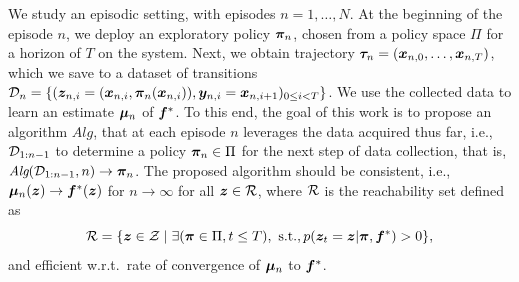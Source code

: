 We study an episodic setting, with episodes $n=1, \ldots, N$. At the beginning of the episode $n$, we deploy an exploratory policy ${\bm{\pi}}_n$, chosen from a policy space $\Pi$ for a horizon of $T$ on the system.  Next, we obtain trajectory ${\bm{\tau}}_n = ({\bm{x}}_{n,0}, \ldots, {\bm{x}}_{n, T})$, which we save to a dataset of transitions  ${\mathcal{D}}_n = \left\{({\bm{z}}_{n, i } = ({\bm{x}}_{n, i}, {\bm{\pi}}_n({\bm{x}}_{n, i})), {\bm{y}}_{n, i} = {\bm{x}}_{n, i + 1})_{0 \le i < T}\right\}$.
We use the collected data to learn an estimate ${\bm{\mu}}_n$ of ${\bm{f}}^*$. 
To this end, the goal of this work is to propose an algorithm $\textit{Alg}$, that at each episode $n$ leverages the data acquired thus far, i.e., ${\mathcal{D}}_{1:n-1}$ to determine a policy ${\bm{\pi}}_n \in \Pi$ for the next step of data collection, that is,  $\textit{Alg}({\mathcal{D}}_{1:n-1}, n) \to {\bm{\pi}}_n$. The proposed algorithm should be consistent, i.e., ${\bm{\mu}}_n({\bm{z}}) \to {\bm{f}}^*({\bm{z}})$ for $n \to \infty$ for all ${\bm{z}} \in {\mathcal{R}}$, where ${\mathcal{R}}$ is the reachability set defined as
\begin{equation*}
   {\mathcal{R}} = \{ {\bm{z}} \in {\mathcal{Z}} \mid \exists ({\bm{\pi}} \in \Pi, t \leq T), \text{ s.t.}, p({\bm{z}}_t={\bm{z}}|{\bm{\pi}}, {\bm{f}}^*) > 0\}, 
\end{equation*} 
and efficient w.r.t.~rate of convergence of ${\bm{\mu}}_n$ 
 to ${\bm{f}}^*$.

